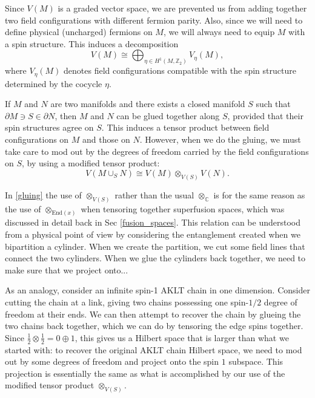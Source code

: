 \documentclass[12pt,a4paper]{article}
\newcounter{arrow}
\newcommand{\tp}{\otimes}
\newcommand{\ra}{\rightarrow}
\newcommand{\cc}{\mathbb{C}}
\newcommand{\zt}{\mathbb{Z}_2}
\newcommand\be            {\begin{equation}}
\newcommand\ee            {\end{equation}}
\newcommand{\End}{\text{End}}
\newcommand{\p}{\partial}
\begin{document}
Since $V(M)$ is a graded vector space, we are prevented us from adding together two field configurations with different fermion parity. Also, since we will need to define physical (uncharged) fermions on $M$, we will always need to equip $M$ with a spin structure. This induces a decomposition 
\be V(M) \cong \bigoplus_{\eta \in H^1(M,\zt)}V_\eta(M),\ee
where $V_\eta(M)$ denotes field configurations compatible with the spin structure determined by the cocycle $\eta$. 

If $M$ and $N$ are two manifolds and there exists a closed manifold $S$ such that $\p M \ni S \in \p N$, then $M$ and $N$ can be glued together along $S$, provided that their spin structures agree on $S$. This induces a tensor product between field configurations on $M$ and those on $N$. However, when we do the gluing, we must take care to mod out by the degrees of freedom carried by the field configurations on $S$, by using a modified tensor product:
\be \label{gluing} V(M\cup_SN) \cong V(M)\tp_{V(S)} V(N).\ee

In \eqref{gluing} the use of $\tp_{V(S)}$ rather than the usual $\tp_\cc$ is for the same reason as the use of $\tp_{\End(x)}$ when tensoring together superfusion spaces, which was discussed in detail back in Sec \ref{fusion_spaces}. This relation can be understood from a physical point of view by considering the entanglement created when we bipartition a cylinder. When we create the partition, we cut some field lines that connect the two cylinders. When we glue the cylinders back together, we need to make sure that we project onto...

As an analogy, consider an infinite spin-1 AKLT chain in one dimension. Consider cutting the chain at a link, giving two chains possessing one spin-$1/2$ degree of freedom at their ends. We can then attempt to recover the chain by glueing the two chains back together, which we can do by tensoring the edge spins together. Since $\frac{1}{2}\tp \frac{1}{2} = 0\oplus 1$, this gives us a Hilbert space that is larger than what we started with: to recover the original AKLT chain Hilbert space, we need to mod out by some degrees of freedom and project onto the spin $1$ subspace. This projection is essentially the same as what is accomplished by our use of the modified tensor product $\tp_{V(S)}$. 

\end{document}
